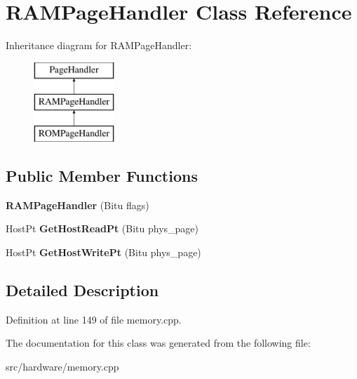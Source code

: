 \hypertarget{classRAMPageHandler}{\section{R\-A\-M\-Page\-Handler Class Reference}
\label{classRAMPageHandler}
}
Inheritance diagram for R\-A\-M\-Page\-Handler\-:\begin{figure}[H]
\begin{center}
\leavevmode
\includegraphics[height=3.000000cm]{classRAMPageHandler}
\end{center}
\end{figure}
\subsection*{Public Member Functions}
\begin{DoxyCompactItemize}
\item 
\hypertarget{classRAMPageHandler_a1a9d31214da07316be390b315bd48344}{{\bfseries R\-A\-M\-Page\-Handler} (Bitu flags)}\label{classRAMPageHandler_a1a9d31214da07316be390b315bd48344}

\item 
\hypertarget{classRAMPageHandler_aa96438cf48e183202b6d9bdef1ff858a}{Host\-Pt {\bfseries Get\-Host\-Read\-Pt} (Bitu phys\-\_\-page)}\label{classRAMPageHandler_aa96438cf48e183202b6d9bdef1ff858a}

\item 
\hypertarget{classRAMPageHandler_a08d7b2d963c5afb626c6aea199bc3a1b}{Host\-Pt {\bfseries Get\-Host\-Write\-Pt} (Bitu phys\-\_\-page)}\label{classRAMPageHandler_a08d7b2d963c5afb626c6aea199bc3a1b}

\end{DoxyCompactItemize}


\subsection{Detailed Description}


Definition at line 149 of file memory.\-cpp.



The documentation for this class was generated from the following file\-:\begin{DoxyCompactItemize}
\item 
src/hardware/memory.\-cpp\end{DoxyCompactItemize}
